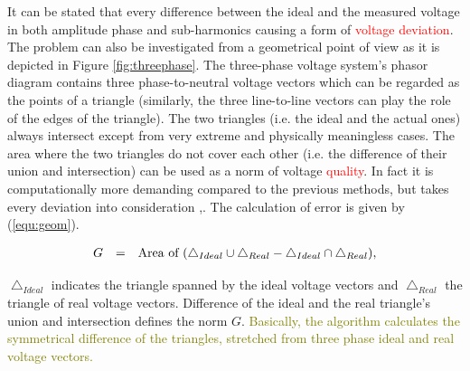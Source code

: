             It can be stated that every difference between the ideal and the measured voltage in both amplitude phase and sub-harmonics causing a form of \textcolor{red}{voltage deviation}. The problem can also be investigated from a geometrical point of view as it is depicted in Figure \ref{fig:threephase}. The three-phase voltage system's phasor diagram contains three  phase-to-neutral voltage vectors which can be regarded as the points of a triangle (similarly, the three line-to-line vectors can play the role of the edges of the triangle). The two triangles (i.e. the ideal and the actual ones) always intersect except from very extreme and physically meaningless cases. The area where the two triangles do not cover each other (i.e. the difference of their union and intersection) can be used as a norm of voltage \textcolor{red}{quality}. In fact it is computationally more demanding compared to the previous methods, but takes every deviation into consideration \cite{Neukirchner2015},\cite{neukirchner2015examination}. The calculation of error is given by (\ref{equ:geom}).

            \begin{equation}
                \begin{array}{rcl}
                       G&=&\textnormal{Area of }(\bigtriangleup_{Ideal}\cup\bigtriangleup_{Real}-\bigtriangleup_{Ideal}\cap\bigtriangleup_{Real}),
                \end{array}
                \label{equ:geom}
            \end{equation}

            $\bigtriangleup_{Ideal}$ indicates the triangle spanned by the ideal voltage vectors and $\bigtriangleup_{Real}$ the triangle of real voltage vectors. Difference of the ideal and the real triangle's union and intersection defines the norm $G$. \textcolor{olive}{Basically, the algorithm calculates the symmetrical difference of the triangles, stretched from three phase ideal and real voltage vectors.}

